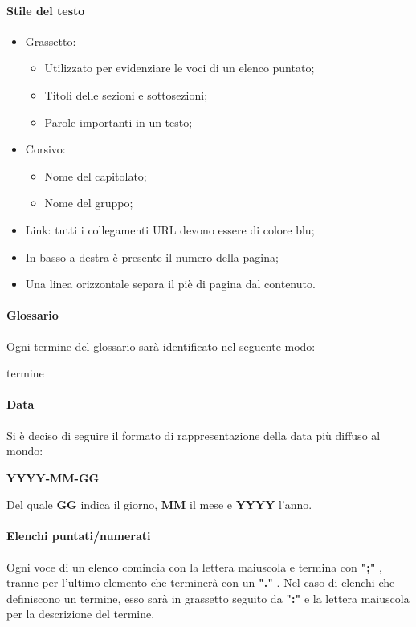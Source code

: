 \paragraph{Stile del testo}
\begin{itemize}
\item Grassetto:
\begin{itemize}
\item Utilizzato per evidenziare le voci di un elenco puntato;
\item Titoli delle sezioni e sottosezioni;
\item Parole importanti in un testo;
\end{itemize}
\item Corsivo:
\begin{itemize}
\item Nome del capitolato;
\item Nome del gruppo;
\end{itemize}
\item Link: tutti i collegamenti URL devono essere di colore blu;
\item In basso a destra è presente il numero della pagina;
\item Una linea orizzontale separa il piè di pagina dal contenuto.

\end{itemize}

\paragraph*{Glossario}
Ogni termine del glossario sarà identificato nel seguente modo:
\begin{center}
termine
\end{center}

\paragraph*{Data}

Si è deciso di seguire il formato di rappresentazione della data più diffuso al mondo:\\
\begin{center}
\textbf{YYYY-MM-GG}
\end{center}
Del quale \textbf{GG} indica il giorno, \textbf{MM} il mese e \textbf{YYYY} l'anno.

\paragraph*{Elenchi puntati/numerati}
Ogni voce di un elenco comincia con la lettera maiuscola e termina con \textbf{";"} , tranne per l'ultimo elemento che terminerà con un \textbf{"."} . 
Nel caso di elenchi che definiscono un termine, esso sarà in grassetto seguito da \textbf{":"} e la lettera maiuscola per la descrizione del termine.


